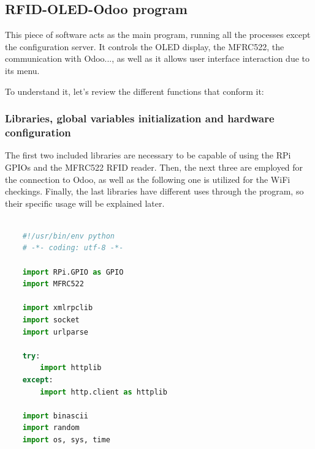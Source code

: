 \documentclass[12pt,a4paper,oneside]{article} %
\begin{document}
\subsection{RFID-OLED-Odoo program}


This piece of software acts as the main program, running all the processes except the configuration server. It controls the OLED display, the MFRC522, the communication with Odoo..., as well as it allows user interface interaction due to its menu.

To understand it, let's review the different functions that conform it:

\subsubsection*{Libraries, global variables initialization and hardware configuration}

The first two included libraries are necessary to be capable of using the RPi GPIOs and the MFRC522 RFID reader. Then, the next three are employed for the connection to Odoo, as well as the following one is utilized for the WiFi checkings. Finally, the last libraries have different uses through the program, so their specific usage will be explained later. 

\begin{lstlisting}[language=python]
	
	#!/usr/bin/env python
	# -*- coding: utf-8 -*-

	import RPi.GPIO as GPIO
	import MFRC522

	import xmlrpclib
	import socket
	import urlparse

	try:
    	import httplib
	except:
    	import http.client as httplib

	import binascii
	import random
	import os, sys, time
	
\end{lstlisting}
\end{document}
